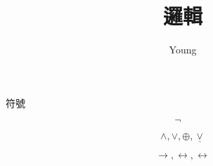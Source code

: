 \documentclass{article}
\title{邏輯}
\author{Young}
\date{}
\begin{document}
\maketitle

符號

\[
\neg \quad
\]

\[
\land, \lor, \oplus, \underline{\lor}
\]

\[
\rightarrow, \leftrightarrow, \longleftrightarrow
\]
\end{document}
